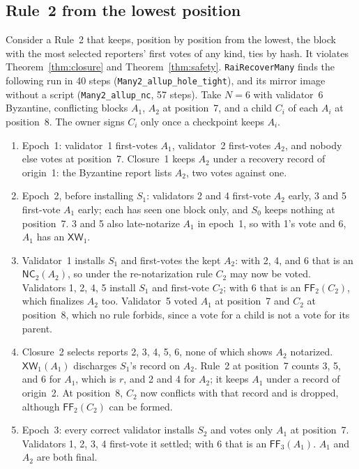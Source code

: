 \documentclass[conference]{IEEEtran}
\newcommand{\NC}{\mathsf{NC}}
\newcommand{\XW}{\mathsf{XW}}
\newcommand{\FF}{\mathsf{FF}}
\begin{document}
\subsection{Rule~2 from the lowest position}
\label{app:bottomup}
Consider a Rule~2 that keeps, position by position from the lowest, the block with the most selected reporters' first votes of any kind, ties by hash. It violates Theorem~\ref{thm:closure} and Theorem~\ref{thm:safety}. \texttt{RaiRecoverMany} finds the following run in 40 steps (\texttt{Many2\_allup\_hole\_tight}), and its mirror image without a script (\texttt{Many2\_allup\_nc}, 57 steps). Take $N=6$ with validator~6 Byzantine, conflicting blocks $A_1$, $A_2$ at position~7, and a child $C_i$ of each $A_i$ at position~8. The owner signs $C_i$ only once a checkpoint keeps $A_i$.
\begin{enumerate}
\item Epoch~1: validator~1 first-votes $A_1$, validator~2 first-votes $A_2$, and nobody else votes at position~7. Closure~1 keeps $A_2$ under a recovery record of origin~1: the Byzantine report lists $A_2$, two votes against one.
\item Epoch~2, before installing $S_1$: validators 2 and 4 first-vote $A_2$ early, 3 and 5 first-vote $A_1$ early; each has seen one block only, and $S_0$ keeps nothing at position~7. 3 and 5 also late-notarize $A_1$ in epoch~1, so with 1's vote and 6, $A_1$ has an $\XW_1$.
\item Validator~1 installs $S_1$ and first-votes the kept $A_2$: with 2, 4, and 6 that is an $\NC_2(A_2)$, so under the re-notarization rule $C_2$ may now be voted. Validators 1, 2, 4, 5 install $S_1$ and first-vote $C_2$; with 6 that is an $\FF_2(C_2)$, which finalizes $A_2$ too. Validator~5 voted $A_1$ at position~7 and $C_2$ at position~8, which no rule forbids, since a vote for a child is not a vote for its parent.
\item Closure~2 selects reports 2, 3, 4, 5, 6, none of which shows $A_2$ notarized. $\XW_1(A_1)$ discharges $S_1$'s record on $A_2$. Rule~2 at position~7 counts 3, 5, and 6 for $A_1$, which is $r$, and 2 and 4 for $A_2$; it keeps $A_1$ under a record of origin~2. At position~8, $C_2$ now conflicts with that record and is dropped, although $\FF_2(C_2)$ can be formed.
\item Epoch~3: every correct validator installs $S_2$ and votes only $A_1$ at position~7. Validators 1, 2, 3, 4 first-vote it settled; with 6 that is an $\FF_3(A_1)$. $A_1$ and $A_2$ are both final.
\end{enumerate}
\end{document}
